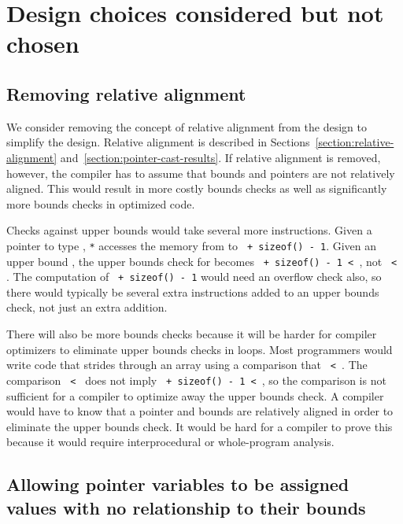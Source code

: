 
\chapter{Design choices considered but not chosen}
\label{chapter:design-alternatives}

\section{Removing relative alignment}
\label{section:design-alternatives:always-unaligned}

We consider removing the concept of relative alignment from the design to simplify
the design.  Relative alignment is described in Sections~\ref{section:relative-alignment}
and~\ref{section:pointer-cast-results}.  If relative alignment
is removed, however, the compiler has to assume that bounds and pointers are
not relatively aligned.   This would result in more costly bounds checks
as well as significantly more bounds checks in optimized code.

Checks against upper bounds would  take several more instructions.
Given a pointer  to type , \texttt{*} accesses the memory from
 to \texttt{ + sizeof() - 1}. Given an upper bound , the
upper bounds check for  becomes \texttt{ + sizeof() - 1 < },
not \texttt{ < }.  The
computation of \texttt{ + sizeof() - 1} would need an overflow check also, 
so there would typically be several extra instructions added to an upper bounds check, 
not just an extra addition.

There will also be more bounds checks because it will be harder for compiler optimizers
to eliminate upper bounds checks in loops.  Most programmers would write code that
strides through an array using a comparison that
\texttt{ \textless{} }. The comparison 
\texttt{ < } does not imply
\texttt{ + sizeof() - 1 < }, so the comparison is
not sufficient for a compiler to optimize away
the upper bounds check. A compiler would have to know that a pointer
and bounds are relatively aligned in order to eliminate the upper bounds
check. It would be hard for a compiler to prove this because it would
require interprocedural or whole-program analysis.

\section{Allowing pointer variables to be assigned values with no relationship to their bounds}

